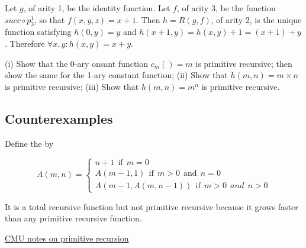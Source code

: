  Let $g$, of arity 1,  be the identity function.   Let $f$, of arity 3, be the function $succ \circ p^1_3$, so that $f(x,y,z) = x + 1$.  Then $h = R(g,f)$, of arity 2, is the unique function satisfying $h(0,y) = y$ and $h(x+1,y) = h(x,y) + 1 = (x+1) + y$.  Therefore $\forall x,y: h(x,y) = x + y$.

 (i) Show that the 0-ary onsant function $c_m() = m$ is primitive recursive; then show the same for the 1-ary constant function; (ii) Show that $h(m,n) = m\times n$ is primitive recursive; (iii) Show that $h(m,n) = m^n$ is primitive recursive.


\subsection{Counterexamples}

Define the  by

$$
A(m,n) = \begin{cases}
               n+ 1 \ \ \text{if} \ \ m = 0\\
              A(m-1,1) \ \ \text{if} \ \ m > 0 \ \ \text{and} \ \ n = 0 \\
              A(m-1,A(m,n-1)) \ \ \text{if} \ \ m > 0 \ \ and \ \ n > 0
            \end{cases}
$$

It is a total recursive function but not primitive recursive because it grows faster than any primitive recursive function.


\href{https://www.andrew.cmu.edu/user/kk3n/complearn/chapter2.pdf}{CMU notes on primitive recursion}
